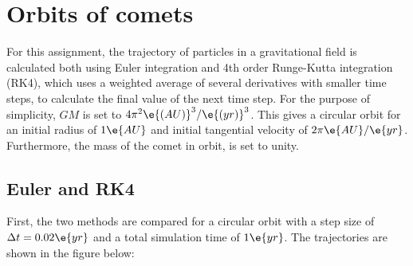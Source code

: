 \documentclass[a4paper,10pt]{article} 	%
\numberwithin{equation}{section}
\begin{document}
 	
 	\section{Orbits of comets}
 	For this assignment, the trajectory of particles in a gravitational field is calculated both using Euler integration and 4th order Runge-Kutta integration (RK4), which uses a weighted average of several derivatives with smaller time steps, to calculate the final value of the next time step. For the purpose of simplicity, $ GM $ is set to $ 4\pi^2 \e{(AU)}^3/\e{(yr)}^3 $. This gives a circular orbit for an initial radius of $ 1 \e{AU} $ and initial tangential velocity of $ 2 \pi \e{AU}/\e{yr} $. Furthermore, the mass of the comet in orbit, is set to unity. 
 	
 	\subsection{Euler and RK4}
 	First, the two methods are compared for a circular orbit with a step size of $ \Delta t = 0.02 \e{yr} $ and a total simulation time of $ 1 \e{yr} $. The trajectories are shown in the figure below:
 	
\end{document}
